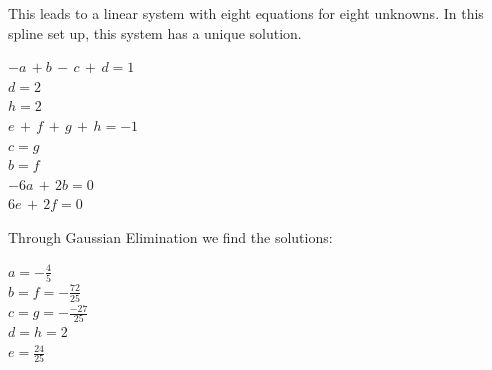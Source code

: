 \documentclass[a4paper,12pt]{report}
\begin{document}
	\noindent This leads to a linear system with eight equations for eight unknowns.  In this spline set up, this system has a unique solution.

\begin{center}


\fbox
{
	\parbox{0.4\textwidth}
	{
		\begin{center}
			$-a\,+b\,-\,c\,+\,d = 1$\\
			$d = 2$\\
			$h = 2$\\
			$e\,+\,f\,+\,g\,+\,h = -1$\\
			$c = g$\\
			$b = f$\\
			$-6a\,+\,2b=0$\\
			$6e\,+\,2f=0$
		\end{center}
	}
}

\end{center}


	\noindent Through Gaussian Elimination we find the solutions:
\begin{center}
\fbox
{
	\parbox{0.4\textwidth}
	{
	\begin{center}
		$a = -\frac{4}{5}$\\
		\medskip
		$b = f = - \frac{72}{25}$\\
		\medskip
		$c = g = -\frac{-27}{25}$\\
		\medskip
		$d = h = 2$\\
		\medskip
		$e = \frac{24}{25}$\\
	\end{center}
	}
}
\end{center}
\end{document}
